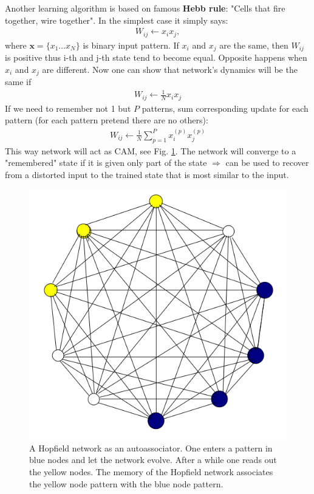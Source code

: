 \vspace{2em}
Another learning algorithm is based on famous \textbf{Hebb rule}: "Cells that fire together, wire together". In the simplest case it simply says:
\begin{gather}
W_{ij} \leftarrow x_ix_j,
\end{gather}
where $\mathbf{x}=\{x_1 \ldots x_N\}$ is binary input pattern. If $x_i$ and $x_j$ are the same, then $W_{ij}$ is positive thus i-th and j-th state tend to become equal. Opposite happens when $x_i$ and $x_j$ are different. Now one can show that network's dynamics will be the same if
\begin{gather}
W_{ij} \leftarrow \frac{1}{N}x_ix_j
\end{gather}
If we need to remember not 1 but $P$ patterns, sum corresponding update for each pattern (for each pattern pretend there are no others):		
\begin{gather}
W_{ij} \leftarrow \frac{1}{N}\sum_{p=1}^Px_i^{(p)}x_j^{(p)}
\end{gather}
This way network will act as CAM, see Fig. \ref{fig:hopfield}. The network will converge to a "remembered" state if it is given only part of the state $\Rightarrow$ can be used to recover from a distorted input to the trained state that is most similar to the input.
\begin{figure}[h]
\begin{mdframed}
\includegraphics[scale=0.4]{img/hopfield.png}
\centering
\caption{A Hopfield network as an autoassociator. One enters a pattern in
blue nodes and let the network evolve. After a while one reads out the yellow
nodes. The memory of the Hopfield network associates the yellow node pattern
with the blue node pattern.}
\label{fig:hopfield}
\end{mdframed}
\end{figure}


